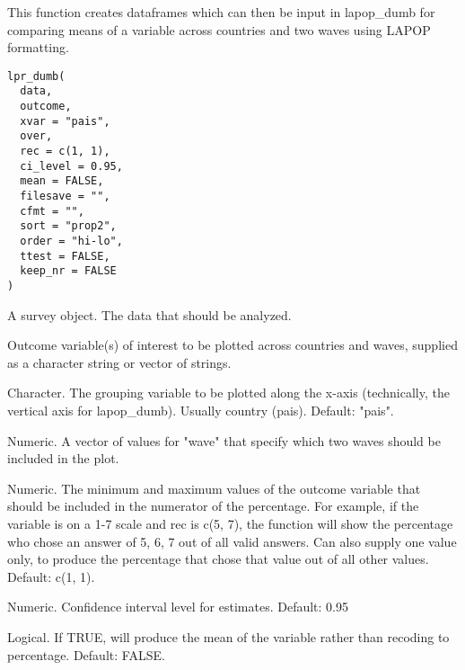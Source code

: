 \documentclass[a4paper]{book}
\begin{document}
%
\begin{Description}
This function creates dataframes which can then be input in lapop\_dumb for
comparing means of a variable across countries and two waves using LAPOP formatting.
\end{Description}
%
\begin{Usage}
\begin{verbatim}
lpr_dumb(
  data,
  outcome,
  xvar = "pais",
  over,
  rec = c(1, 1),
  ci_level = 0.95,
  mean = FALSE,
  filesave = "",
  cfmt = "",
  sort = "prop2",
  order = "hi-lo",
  ttest = FALSE,
  keep_nr = FALSE
)
\end{verbatim}
\end{Usage}
%
\begin{Arguments}
\begin{ldescription}
\item[\code{data}] A survey object.  The data that should be analyzed.

\item[\code{outcome}] Outcome variable(s) of interest to be plotted across countries
and waves, supplied as a character string or vector of strings.

\item[\code{xvar}] Character. The grouping variable to be plotted
along the x-axis (technically, the vertical axis for lapop\_dumb). Usually
country (pais). Default: "pais".

\item[\code{over}] Numeric.  A vector of values for "wave" that specify which two
waves should be included in the plot.

\item[\code{rec}] Numeric. The minimum and maximum values of the outcome variable that
should be included in the numerator of the percentage.  For example, if the variable
is on a 1-7 scale and rec is c(5, 7), the function will show the percentage who chose
an answer of 5, 6, 7 out of all valid answers.  Can also supply one value only,
to produce the percentage that chose that value out of all other values.
Default: c(1, 1).

\item[\code{ci\_level}] Numeric. Confidence interval level for estimates.  Default: 0.95

\item[\code{mean}] Logical.  If TRUE, will produce the mean of the variable rather than
recoding to percentage.  Default: FALSE.


\end{ldescription}
\end{Arguments}
\end{document}
